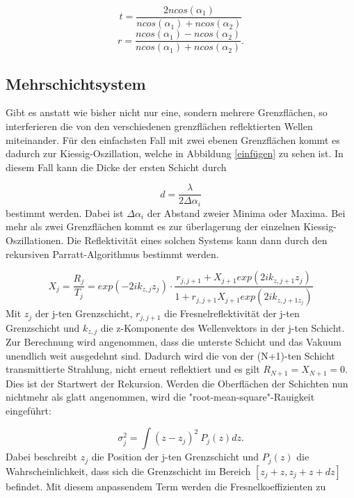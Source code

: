 \begin{equation}
    t = \frac{2 n cos(\alpha_1)}{n cos(\alpha_1) + n cos(\alpha_2)}
\end{equation}
\begin{equation}
    r = \frac{n cos(\alpha_1) - n cos(\alpha_2)}{n cos(\alpha_1) + n cos(\alpha_2)}.
\end{equation}


\subsection{Mehrschichtsystem}
Gibt es anstatt wie bisher nicht nur eine, sondern mehrere Grenzflächen, so interferieren die von den verschiedenen grenzflächen reflektierten Wellen miteinander.
Für den einfachsten Fall mit zwei ebenen Grenzflächen kommt es dadurch zur Kiessig-Oszillation, welche in Abbildung \ref{einfügen} zu sehen ist.
In diesem Fall kann die Dicke der ersten Schicht durch 

\begin{equation}
    d = \frac{\lambda}{2 \Delta \alpha_i}
\end{equation}
bestimmt werden. Dabei ist $\Delta \alpha_i$ der Abstand zweier Minima oder Maxima.
Bei mehr als zwei Grenzflächen kommt es zur überlagerung der einzelnen Kiessig-Oszillationen. 
Die Reflektivität eines solchen Systems kann dann durch den rekursiven Parratt-Algorithmus bestimmt werden.

\begin{equation}
    X_j = \frac{R_j}{T_j} = exp(-2i k_{z,j} z_j) \cdot \frac{r_{j,j+1} + X_{j+1} exp(2i k_{z,j+1} z_j) }{1 + r_{j,j+1} X_{j+1} exp(2i k_{z,j+1 z_j})}
\end{equation}
Mit $z_j$ der j-ten Grenzschicht, $r_{j,j+1}$ die Fresnelreflektivität der j-ten Grenzschicht und $k_{z,j}$ die z-Komponente des Wellenvektors in der j-ten Schicht.
Zur Berechnung wird angenommen, dass die unterste Schicht und das Vakuum unendlich weit ausgedehnt sind. Dadurch wird die von der (N+1)-ten Schicht transmittierte 
Strahlung, nicht erneut reflektiert und es gilt $R_{N+1} = X_{N+1} = 0$.
Dies ist der Startwert der Rekursion.
Werden die Oberflächen der Schichten nun nichtmehr als glatt angenommen, wird die "root-mean-square"-Rauigkeit eingeführt:

\begin{equation}
    \sigma_j^2 = \int (z - z_j)^2 \: P_j(z) dz.
\end{equation}
Dabei beschreibt $z_j$ die Position der j-ten Grenzschicht und $P_j(z)$ die Wahrscheinlichkeit, dass sich die Grenzschicht im Bereich $[z_j + z, z_j + z + dz]$ befindet.
Mit diesem anpassendem Term werden die Fresnelkoeffizienten zu 

